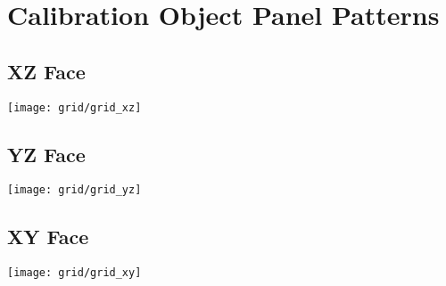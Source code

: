 \clearpage
\section{Calibration Object Panel Patterns}

\subsection*{XZ Face}
\texttt{[image: grid/grid\_xz]}


\subsection*{YZ Face}
\texttt{[image: grid/grid\_yz]}

\subsection*{XY Face}
\texttt{[image: grid/grid\_xy]}
